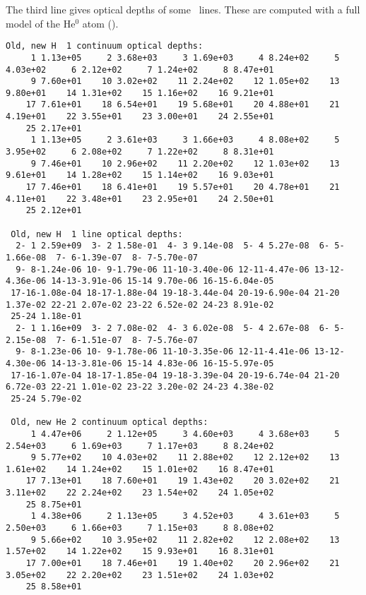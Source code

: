 The third line gives optical depths of some \hei\ lines.  These are
computed with a full model of the He$^0$ atom (\citealp{Porter2005}).

{\setverbatimfontsize{\tiny}
\begin{verbatim}
Old, new H  1 continuum optical depths:
     1 1.13e+05     2 3.68e+03     3 1.69e+03     4 8.24e+02     5 4.03e+02     6 2.12e+02     7 1.24e+02     8 8.47e+01
     9 7.60e+01    10 3.02e+02    11 2.24e+02    12 1.05e+02    13 9.80e+01    14 1.31e+02    15 1.16e+02    16 9.21e+01
    17 7.61e+01    18 6.54e+01    19 5.68e+01    20 4.88e+01    21 4.19e+01    22 3.55e+01    23 3.00e+01    24 2.55e+01
    25 2.17e+01
     1 1.13e+05     2 3.61e+03     3 1.66e+03     4 8.08e+02     5 3.95e+02     6 2.08e+02     7 1.22e+02     8 8.31e+01
     9 7.46e+01    10 2.96e+02    11 2.20e+02    12 1.03e+02    13 9.61e+01    14 1.28e+02    15 1.14e+02    16 9.03e+01
    17 7.46e+01    18 6.41e+01    19 5.57e+01    20 4.78e+01    21 4.11e+01    22 3.48e+01    23 2.95e+01    24 2.50e+01
    25 2.12e+01

 Old, new H  1 line optical depths:
  2- 1 2.59e+09  3- 2 1.58e-01  4- 3 9.14e-08  5- 4 5.27e-08  6- 5-1.66e-08  7- 6-1.39e-07  8- 7-5.70e-07
  9- 8-1.24e-06 10- 9-1.79e-06 11-10-3.40e-06 12-11-4.47e-06 13-12-4.36e-06 14-13-3.91e-06 15-14 9.70e-06 16-15-6.04e-05
 17-16-1.08e-04 18-17-1.88e-04 19-18-3.44e-04 20-19-6.90e-04 21-20 1.37e-02 22-21 2.07e-02 23-22 6.52e-02 24-23 8.91e-02
 25-24 1.18e-01
  2- 1 1.16e+09  3- 2 7.08e-02  4- 3 6.02e-08  5- 4 2.67e-08  6- 5-2.15e-08  7- 6-1.51e-07  8- 7-5.76e-07
  9- 8-1.23e-06 10- 9-1.78e-06 11-10-3.35e-06 12-11-4.41e-06 13-12-4.30e-06 14-13-3.81e-06 15-14 4.83e-06 16-15-5.97e-05
 17-16-1.07e-04 18-17-1.85e-04 19-18-3.39e-04 20-19-6.74e-04 21-20 6.72e-03 22-21 1.01e-02 23-22 3.20e-02 24-23 4.38e-02
 25-24 5.79e-02

 Old, new He 2 continuum optical depths:
     1 4.47e+06     2 1.12e+05     3 4.60e+03     4 3.68e+03     5 2.54e+03     6 1.69e+03     7 1.17e+03     8 8.24e+02
     9 5.77e+02    10 4.03e+02    11 2.88e+02    12 2.12e+02    13 1.61e+02    14 1.24e+02    15 1.01e+02    16 8.47e+01
    17 7.13e+01    18 7.60e+01    19 1.43e+02    20 3.02e+02    21 3.11e+02    22 2.24e+02    23 1.54e+02    24 1.05e+02
    25 8.75e+01
     1 4.38e+06     2 1.13e+05     3 4.52e+03     4 3.61e+03     5 2.50e+03     6 1.66e+03     7 1.15e+03     8 8.08e+02
     9 5.66e+02    10 3.95e+02    11 2.82e+02    12 2.08e+02    13 1.57e+02    14 1.22e+02    15 9.93e+01    16 8.31e+01
    17 7.00e+01    18 7.46e+01    19 1.40e+02    20 2.96e+02    21 3.05e+02    22 2.20e+02    23 1.51e+02    24 1.03e+02
    25 8.58e+01


\end{verbatim}}
